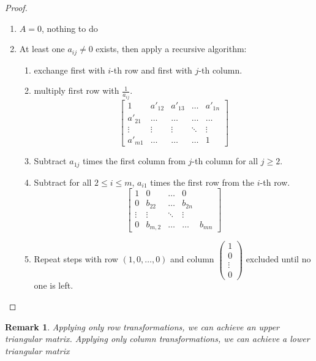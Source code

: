 \documentclass[a4paper,landscape,twocolumn]{article}
\newtheorem{rem}{Remark}[section]
\begin{document}
\begin{proof}
  \begin{enumerate}
    \item $A = 0$, nothing to do
    \item At least one $a_{ij} \neq 0$ exists, then apply a recursive algorithm:
      \begin{enumerate}
        \item exchange first with $i$-th row and first with $j$-th column.
        \item multiply first row with $\frac1{a_{ij}}$.
          \[
            \begin{bmatrix}
              1 & a'_{12} & a'_{13} & \ldots & a'_{1n} \\
              a'_{21} & \ldots & \ldots & \ldots & \ldots \\
              \vdots & \vdots & \vdots & \ddots & \vdots \\
              a'_{m1} & \ldots & \ldots & \ldots & 1
            \end{bmatrix}
          \]
        \item
          Subtract $a_{1j}$ times the first column from $j$-th column for all $j \geq 2$.
        \item
          Subtract for all $2 \leq i \leq m$, $a_{i1}$ times the first row from the $i$-th row.
          \[
            \begin{bmatrix}
              1 & 0 & \ldots & 0 \\
              0 & b_{22} & \ldots & b_{2n} \\
              \vdots & \vdots & \ddots & \vdots \\
              0 & b_{m,2} & \ldots & \ldots & b_{mn}
            \end{bmatrix}
          \]
        \item Repeat steps with row $(1, 0, \ldots, 0)$ and column $\begin{pmatrix} 1 \\ 0 \\ \vdots \\ 0 \end{pmatrix}$ excluded until no one is left.
      \end{enumerate}
  \end{enumerate}
\end{proof}
%
\begin{rem}
  Applying only row transformations, we can achieve an upper triangular matrix.
  Applying only column transformations, we can achieve a lower triangular matrix
\end{rem}
\end{document}
